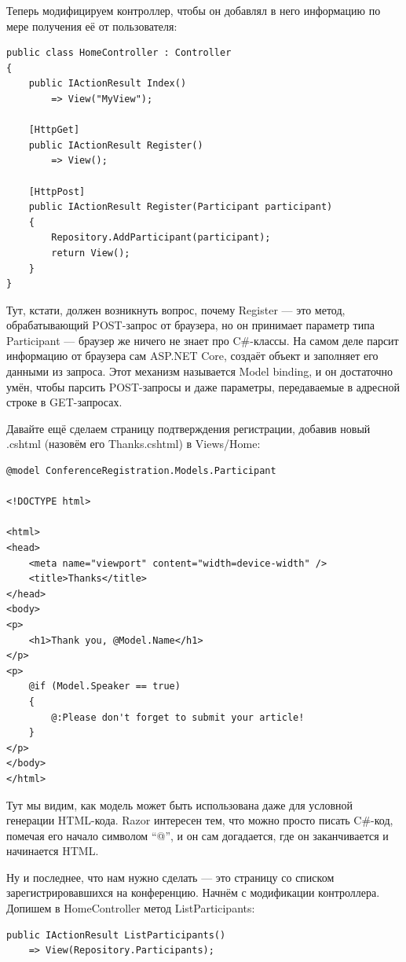 \documentclass[a5paper]{article}
\begin{document}
Теперь модифицируем контроллер, чтобы он добавлял в него информацию по мере получения её от пользователя:

\begin{verbatim}
public class HomeController : Controller
{
    public IActionResult Index()
        => View("MyView");

    [HttpGet]
    public IActionResult Register()
        => View();

    [HttpPost]
    public IActionResult Register(Participant participant)
    {
        Repository.AddParticipant(participant);
        return View();
    }
}
\end{verbatim}

Тут, кстати, должен возникнуть вопрос, почему Register --- это метод, обрабатывающий POST-запрос от браузера, но он принимает параметр типа Participant --- браузер же ничего не знает про C\#-классы. На самом деле парсит информацию от браузера сам ASP.NET Core, создаёт объект и заполняет его данными
из запроса. Этот механизм называется Model binding, и он достаточно умён, чтобы парсить POST-запросы и даже параметры, передаваемые в адресной строке в GET-запросах.

Давайте ещё сделаем страницу подтверждения регистрации, добавив новый .cshtml (назовём его Thanks.cshtml) в Views/Home:

\begin{verbatim}
@model ConferenceRegistration.Models.Participant

<!DOCTYPE html>

<html>
<head>
    <meta name="viewport" content="width=device-width" />
    <title>Thanks</title>
</head>
<body>
<p>
    <h1>Thank you, @Model.Name</h1>
</p>
<p>
    @if (Model.Speaker == true)
    {
        @:Please don't forget to submit your article!
    }
</p>
</body>
</html>
\end{verbatim}

Тут мы видим, как модель может быть использована даже для условной генерации HTML-кода. Razor интересен тем, что можно просто писать C\#-код, помечая его начало символом ``@'', и он сам догадается, где он заканчивается и начинается HTML.

Ну и последнее, что нам нужно сделать --- это страницу со списком зарегистрировавшихся на конференцию. Начнём с модификации контроллера. Допишем в HomeController метод ListParticipants:
\begin{verbatim}
public IActionResult ListParticipants()
    => View(Repository.Participants);
\end{verbatim}
\end{document}
